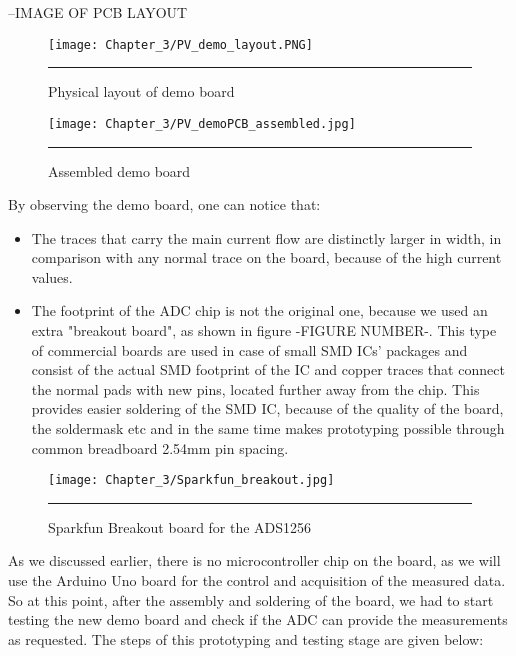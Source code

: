 --IMAGE OF PCB LAYOUT\\

\begin{figure}[htbp]
	\centering
		\texttt{[image: Chapter\_3/PV\_demo\_layout.PNG]}
		\rule{35em}{0.5pt}
	\caption{Physical layout of demo board}
	\label{fig:PV_demo_layout}
\end{figure}

\begin{figure}[htbp]
	\centering
		\texttt{[image: Chapter\_3/PV\_demoPCB\_assembled.jpg]}
		\rule{35em}{0.5pt}
	\caption{Assembled demo board}
	\label{fig:PV_demoPCB_assembled}
\end{figure}

By observing the demo board, one can notice that:

\begin{itemize}
    \item The traces that carry the main current flow are distinctly larger in width, in comparison with any normal trace on the board, because of the high current values.
    \item The footprint of the ADC chip is not the original one, because we used an extra "breakout board", as shown in figure -FIGURE NUMBER-. This type of commercial boards are used in case of small SMD ICs' packages and consist of the actual SMD footprint of the IC and copper traces that connect the normal pads with new pins, located further away from the chip. This provides easier soldering of the SMD IC, because of the quality of the board, the soldermask etc and in the same time makes prototyping possible through common breadboard 2.54mm pin spacing.
\end{itemize} 

\begin{figure}[htbp]
	\centering
		\texttt{[image: Chapter\_3/Sparkfun\_breakout.jpg]}
		\rule{35em}{0.5pt}
	\caption{Sparkfun Breakout board for the ADS1256}
	\label{fig:Sparkfun_breakout}
\end{figure}

As we discussed earlier, there is no microcontroller chip on the board, as we will use the Arduino Uno board for the control and acquisition of the measured data. So at this point, after the assembly and soldering of the board, we had to start testing the new demo board and check if the ADC can provide the measurements as requested. The steps of this prototyping and testing stage are given below:

